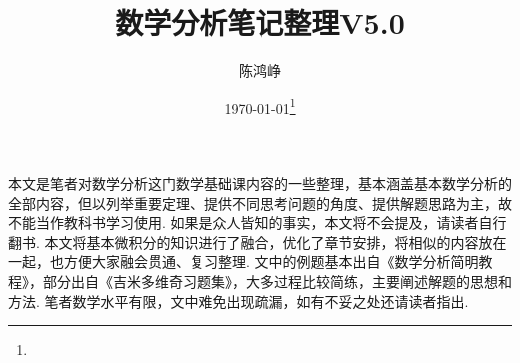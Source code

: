 \documentclass{note}
\title{数学分析笔记整理V5.0}
\author{陈鸿峥}
\date{{\builddatemonth\today}\protect \footnote{\text{Build \builddate\today}}}%
\renewcommand{\thefootnote}{\fnsymbol{footnote}}
\begin{document}
 

\maketitle
\renewcommand{\thefootnote}{\arabic{footnote}}
\setcounter{footnote}{0}

\setcounter{tocdepth}{2}%
\tableofcontents
\bigskip\bigskip\bigskip

\par 本文是笔者对数学分析这门数学基础课内容的一些整理，基本涵盖基本数学分析的全部内容，但以列举重要定理、提供不同思考问题的角度、提供解题思路为主，故不能当作教科书学习使用. 如果是众人皆知的事实，本文将不会提及，请读者自行翻书. 本文将基本微积分的知识进行了融合，优化了章节安排，将相似的内容放在一起，也方便大家融会贯通、复习整理. 文中的例题基本出自《数学分析简明教程》，部分出自《吉米多维奇习题集》，大多过程比较简练，主要阐述解题的思想和方法. 笔者数学水平有限，文中难免出现疏漏，如有不妥之处还请读者指出.


















\end{document}
